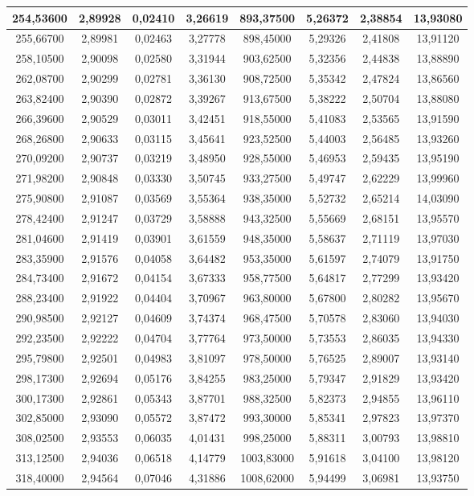 \documentclass[a4paper,12pt]{article}
\numberwithin{equation}{section}
\begin{document}
\begin{appendices}
\begin{longtable}[c]{|c|c|c|c|c|c|c|c|}
254,53600	&	2,89928	&	0,02410	&	3,26619	&	893,37500	&	5,26372	&	2,38854	&	13,93080	\\\hline
255,66700	&	2,89981	&	0,02463	&	3,27778	&	898,45000	&	5,29326	&	2,41808	&	13,91120	\\\hline
258,10500	&	2,90098	&	0,02580	&	3,31944	&	903,62500	&	5,32356	&	2,44838	&	13,88890	\\\hline
262,08700	&	2,90299	&	0,02781	&	3,36130	&	908,72500	&	5,35342	&	2,47824	&	13,86560	\\\hline
263,82400	&	2,90390	&	0,02872	&	3,39267	&	913,67500	&	5,38222	&	2,50704	&	13,88080	\\\hline
266,39600	&	2,90529	&	0,03011	&	3,42451	&	918,55000	&	5,41083	&	2,53565	&	13,91590	\\\hline
268,26800	&	2,90633	&	0,03115	&	3,45641	&	923,52500	&	5,44003	&	2,56485	&	13,93260	\\\hline
270,09200	&	2,90737	&	0,03219	&	3,48950	&	928,55000	&	5,46953	&	2,59435	&	13,95190	\\\hline
271,98200	&	2,90848	&	0,03330	&	3,50745	&	933,27500	&	5,49747	&	2,62229	&	13,99960	\\\hline
275,90800	&	2,91087	&	0,03569	&	3,55364	&	938,35000	&	5,52732	&	2,65214	&	14,03090	\\\hline
278,42400	&	2,91247	&	0,03729	&	3,58888	&	943,32500	&	5,55669	&	2,68151	&	13,95570	\\\hline
281,04600	&	2,91419	&	0,03901	&	3,61559	&	948,35000	&	5,58637	&	2,71119	&	13,97030	\\\hline
283,35900	&	2,91576	&	0,04058	&	3,64482	&	953,35000	&	5,61597	&	2,74079	&	13,91750	\\\hline
284,73400	&	2,91672	&	0,04154	&	3,67333	&	958,77500	&	5,64817	&	2,77299	&	13,93420	\\\hline
288,23400	&	2,91922	&	0,04404	&	3,70967	&	963,80000	&	5,67800	&	2,80282	&	13,95670	\\\hline
290,98500	&	2,92127	&	0,04609	&	3,74374	&	968,47500	&	5,70578	&	2,83060	&	13,94030	\\\hline
292,23500	&	2,92222	&	0,04704	&	3,77764	&	973,50000	&	5,73553	&	2,86035	&	13,94330	\\\hline
295,79800	&	2,92501	&	0,04983	&	3,81097	&	978,50000	&	5,76525	&	2,89007	&	13,93140	\\\hline
298,17300	&	2,92694	&	0,05176	&	3,84255	&	983,25000	&	5,79347	&	2,91829	&	13,93420	\\\hline
300,17300	&	2,92861	&	0,05343	&	3,87701	&	988,32500	&	5,82373	&	2,94855	&	13,96110	\\\hline
302,85000	&	2,93090	&	0,05572	&	3,87472	&	993,30000	&	5,85341	&	2,97823	&	13,97370	\\\hline
308,02500	&	2,93553	&	0,06035	&	4,01431	&	998,25000	&	5,88311	&	3,00793	&	13,98810	\\\hline
313,12500	&	2,94036	&	0,06518	&	4,14779	&	1003,83000	&	5,91618	&	3,04100	&	13,98120	\\\hline
318,40000	&	2,94564	&	0,07046	&	4,31886	&	1008,62000	&	5,94499	&	3,06981	&	13,93750	\\\hline


\end{longtable}
\end{appendices}
\end{document}

